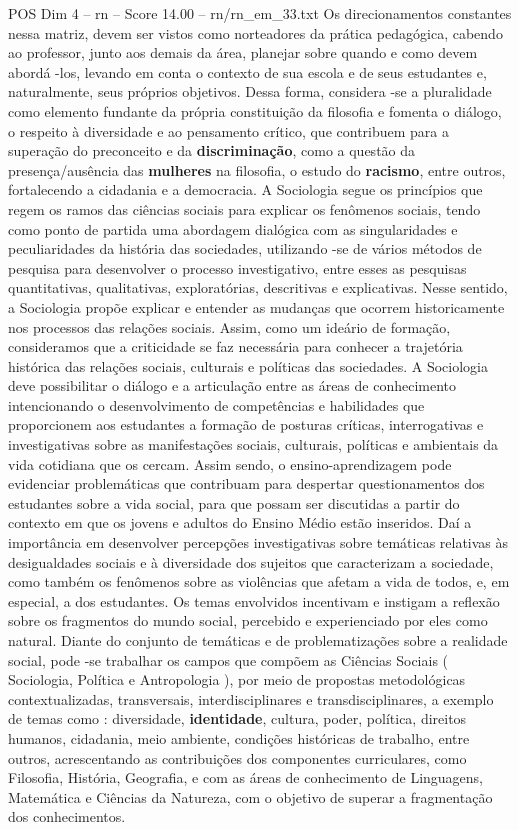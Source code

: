 \begin{textsample}{POS Dim 4 – rn – Score 14.00 – rn/rn\_em\_33.txt}
Os direcionamentos constantes nessa matriz, devem ser vistos como norteadores da prática pedagógica, cabendo ao professor, junto aos demais da área, planejar sobre quando e como devem abordá -los, levando em conta o contexto de sua escola e de seus estudantes e, naturalmente, seus próprios objetivos.
Dessa forma, considera -se a pluralidade como elemento fundante da própria constituição da filosofia e fomenta o diálogo, o respeito à diversidade e ao pensamento crítico, que contribuem para a superação do preconceito e da \textbf{discriminação}, como a questão da presença/ausência das \textbf{mulheres} na filosofia, o estudo do \textbf{racismo}, entre outros, fortalecendo a cidadania e a democracia.
A Sociologia segue os princípios que regem os ramos das ciências sociais para explicar os fenômenos sociais, tendo como ponto de partida uma abordagem dialógica com as singularidades e peculiaridades da história das sociedades, utilizando -se de vários métodos de pesquisa para desenvolver o processo investigativo, entre esses as pesquisas quantitativas, qualitativas, exploratórias, descritivas e explicativas.
Nesse sentido, a Sociologia propõe explicar e entender as mudanças que ocorrem historicamente nos processos das relações sociais.
Assim, como um ideário de formação, consideramos que a criticidade se faz necessária para conhecer a trajetória histórica das relações sociais, culturais e políticas das sociedades.
A Sociologia deve possibilitar o diálogo e a articulação entre as áreas de conhecimento intencionando o desenvolvimento de competências e habilidades que proporcionem aos estudantes a formação de posturas críticas, interrogativas e investigativas sobre as manifestações sociais, culturais, políticas e ambientais da vida cotidiana que os cercam.
Assim sendo, o ensino-aprendizagem pode evidenciar problemáticas que contribuam para despertar questionamentos dos estudantes sobre a vida social, para que possam ser discutidas a partir do contexto em que os jovens e adultos do Ensino Médio estão inseridos.
Daí a importância em desenvolver percepções investigativas sobre temáticas relativas às desigualdades sociais e à diversidade dos sujeitos que caracterizam a sociedade, como também os fenômenos sobre as violências que afetam a vida de todos, e, em especial, a dos estudantes.
Os temas envolvidos incentivam e instigam a reflexão sobre os fragmentos do mundo social, percebido e experienciado por eles como natural.
Diante do conjunto de temáticas e de problematizações sobre a realidade social, pode -se trabalhar os campos que compõem as Ciências Sociais ( Sociologia, Política e Antropologia ), por meio de propostas metodológicas contextualizadas, transversais, interdisciplinares e transdisciplinares, a exemplo de temas como : diversidade, \textbf{identidade}, cultura, poder, política, direitos humanos, cidadania, meio ambiente, condições históricas de trabalho, entre outros, acrescentando as contribuições dos componentes curriculares, como Filosofia, História, Geografia, e com as áreas de conhecimento de Linguagens, Matemática e Ciências da Natureza, com o objetivo de superar a fragmentação dos conhecimentos.

\end{textsample}

